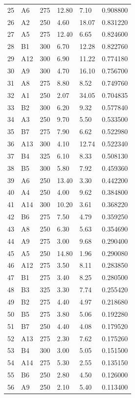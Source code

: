 \begin{longtable}{C{0.07\textwidth}C{0.08\textwidth}C{0.11\textwidth}C{0.18\textwidth}C{0.18\textwidth}C{0.18\textwidth}}
25 & A6 & 275 & 12.80 & 7.10 & 0.908800 \\
26 & A2 & 250 & 4.60 & 18.07 & 0.831220 \\
27 & A5 & 275 & 12.40 & 6.65 & 0.824600 \\
28 & B1 & 300 & 6.70 & 12.28 & 0.822760 \\
29 & A12 & 300 & 6.90 & 11.22 & 0.774180 \\
30 & A9 & 300 & 4.70 & 16.10 & 0.756700 \\
31 & A8 & 275 & 8.80 & 8.52 & 0.749760 \\
32 & A1 & 250 & 2.07 & 34.05 & 0.704835 \\
33 & B2 & 300 & 6.20 & 9.32 & 0.577840 \\
34 & A3 & 250 & 9.70 & 5.50 & 0.533500 \\
35 & B7 & 275 & 7.90 & 6.62 & 0.522980 \\
36 & A13 & 300 & 4.10 & 12.74 & 0.522340 \\
37 & B4 & 325 & 6.10 & 8.33 & 0.508130 \\
38 & B5 & 300 & 5.80 & 7.92 & 0.459360 \\
39 & A6 & 250 & 13.40 & 3.30 & 0.442200 \\
40 & A4 & 250 & 4.00 & 9.62 & 0.384800 \\
41 & A14 & 300 & 10.20 & 3.61 & 0.368220 \\
42 & B6 & 275 & 7.50 & 4.79 & 0.359250 \\
43 & A8 & 250 & 6.30 & 5.63 & 0.354690 \\
44 & A9 & 275 & 3.00 & 9.68 & 0.290400 \\
45 & A5 & 250 & 14.80 & 1.96 & 0.290080 \\
46 & A12 & 275 & 3.50 & 8.11 & 0.283850 \\
47 & B1 & 275 & 3.40 & 8.25 & 0.280500 \\
48 & B3 & 325 & 3.30 & 7.74 & 0.255420 \\
49 & B2 & 275 & 4.40 & 4.97 & 0.218680 \\
50 & B5 & 275 & 3.80 & 5.06 & 0.192280 \\
51 & B7 & 250 & 4.40 & 4.08 & 0.179520 \\
52 & A13 & 275 & 2.30 & 7.62 & 0.175260 \\
53 & B4 & 300 & 3.00 & 5.05 & 0.151500 \\
54 & A14 & 275 & 5.30 & 2.55 & 0.135150 \\
55 & B6 & 250 & 2.80 & 4.50 & 0.126000 \\
56 & A9 & 250 & 2.10 & 5.40 & 0.113400 \\

\end{longtable}
